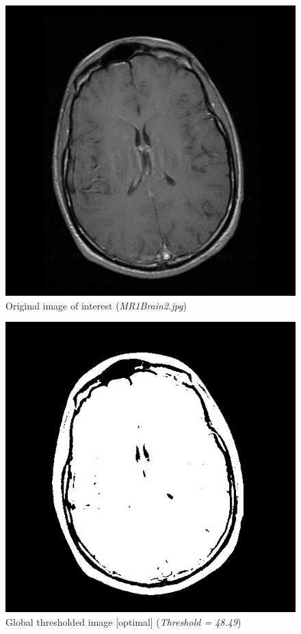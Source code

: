\documentclass[letterpaper, 12 pt, conference ,onecolumn]{ieeeconf}  %
\begin{document}
\begin{figure}[h!]
\centering
\includegraphics[width=0.4\paperwidth]{optimal-thresholding/global/MRI-original-image.jpg}
\caption{Original image of interest (\textit{MR1Brain2.jpg}) }
\label{fig:MRI-original-image}
\end{figure}


\begin{figure}[h!]
\includegraphics[width=0.4\paperwidth]{optimal-thresholding/global/MRI-global-threshold.jpg}
\centering
\caption{Global thresholded image [optimal] (\textit{Threshold = 48.49}) }
\label{fig:MRI-global-threshold}
\end{figure}
\end{document}
